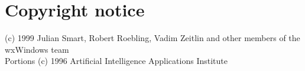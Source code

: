 \begin{comment}
\winhelponly{
\chapter{wxWindows class library reference}\label{winhelpcontents}

\center{
}%

\sethotspotcolour{off}%
\sethotspotunderline{on}%
\large{
\image{}{cpp.bmp} \helpref{Alphabetical class reference}{classref}

\image{}{shelves.bmp} \helpref{Classes by category}{classesbycat}

\image{}{book1.bmp} \helpref{Topic overviews}{overviews}

\image{}{hand1.bmp} \helpref{Guide to wxWindows}{wxwinchapters}
}
\sethotspotcolour{on}%
\sethotspotunderline{on}%

\chapter*{Overview of wxWindows}\label{wxwinchapters}

\helpref{Introduction}{introduction}\\
\helpref{The wxWindows resource system}{resourceformats}\\
\helpref{Utilities}{utilities}\\
\helpref{Programming strategies}{strategies}\\
\helpref{Bugs and future directions}{bugs}\\
\helpref{References}{bibliography}
}
\end{comment}

\chapter{Copyright notice}
%
\setfooter{\thepage}{}{}{}{}{\thepage}%

\begin{center}
(c)  1999 Julian Smart, Robert Roebling, Vadim Zeitlin and other
members of the wxWindows team\\
Portions (c) 1996 Artificial Intelligence Applications Institute\\
\end{center}

